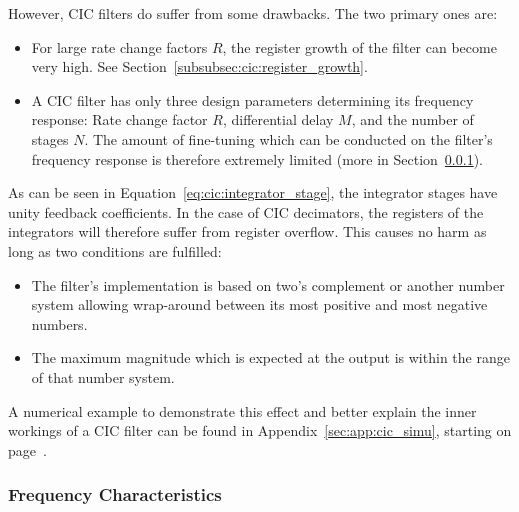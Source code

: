 However, CIC filters do suffer from some drawbacks. The two primary ones are:
\begin{itemize}\tightlist
    \item
        For large rate  change factors $R$, the register growth  of the filter
        can become very high. See Section~\ref{subsubsec:cic:register_growth}.
    \item
        A   CIC  filter   has   only  three   design  parameters   determining
        its   frequency  response: Rate   change   factor  $R$,   differential
        delay   $M$,    and   the    number   of   stages    $N$. The   amount
        of   fine-tuning   which   can    be   conducted   on   the   filter's
        frequency   response  is   therefore   extremely   limited  (more   in
        Section~\ref{subsubsec:cic:frequency_characteristics}).
\end{itemize}

As  can  be  seen in  Equation~\ref{eq:cic:integrator_stage},  the  integrator
stages have  unity feedback coefficients. In  the case of CIC  decimators, the
registers of  the integrators  will therefore  suffer from  register overflow.
This causes no harm as long as two conditions are fulfilled:
\begin{itemize}\tightlist
    \item
        The filter's  implementation is based  on two's complement  or another
        number system allowing wrap-around between  its most positive and most
        negative numbers.
    \item
        The maximum  magnitude which is expected  at the output is  within the
        range of that number system.
\end{itemize}

A numerical  example to demonstrate this  effect and better explain  the inner
workings  of a  CIC filter  can be  found in  Appendix~\ref{sec:app:cic_simu},
starting on page~\pageref{sec:app:cic_simu}.

%
%
\subsubsection{Frequency Characteristics} %
\label{subsubsec:cic:frequency_characteristics}

